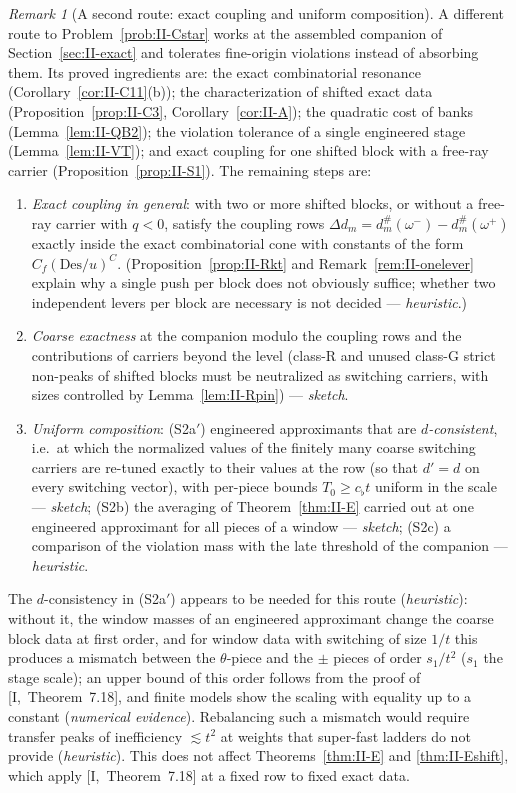 \documentclass[10pt]{amsart}
\theoremstyle{definition}
\theoremstyle{remark}
\newtheorem{remark}[theorem]{Remark}
\begin{document}
\begin{remark}[A second route: exact coupling and uniform composition]\label{rem:II-openS}
A different route to Problem~\ref{prob:II-Cstar} works at the assembled companion of
Section~\ref{sec:II-exact} and tolerates fine-origin violations instead of
absorbing them.  Its proved ingredients are: the exact combinatorial resonance
(Corollary~\ref{cor:II-C11}(b)); the characterization of shifted exact data
(Proposition~\ref{prop:II-C3}, Corollary~\ref{cor:II-A}); the quadratic cost of banks
(Lemma~\ref{lem:II-QB2}); the violation tolerance of a single engineered stage
(Lemma~\ref{lem:II-VT}); and exact coupling for one shifted block with a free-ray
carrier (Proposition~\ref{prop:II-S1}).  The remaining steps are:
\begin{enumerate}
\item[(S1)] \emph{Exact coupling in general}: with two or more shifted blocks, or
without a free-ray carrier with $q<0$, satisfy the coupling rows $\Delta d_m=d^\#_m(\omega^-)-
d^\#_m(\omega^+)$ exactly inside the exact combinatorial cone with constants of the form
$C_f(\mathrm{Des}/u)^C$.  (Proposition~\ref{prop:II-Rkt} and
Remark~\ref{rem:II-onelever} explain why a single push per block does not
obviously suffice; whether two independent levers per block are necessary is
not decided --- \emph{heuristic}.)
\item[(RT$^*$c)] \emph{Coarse exactness} at the companion modulo the coupling rows and
the contributions of carriers beyond the level (class-R and unused class-G strict
non-peaks of shifted blocks must be neutralized as switching carriers, with sizes
controlled by Lemma~\ref{lem:II-Rpin}) --- \emph{sketch}.
\item[(S2)] \emph{Uniform composition}: (S2a$'$) engineered approximants that are
\emph{$d$-consistent}, i.e.\ at which the normalized values of the finitely many coarse
switching carriers are re-tuned exactly to their values at the row (so that $d'=d$ on
every switching vector), with per-piece bounds $T_0\ge c_\flat t$ uniform in the scale
--- \emph{sketch}; (S2b) the averaging of Theorem~\ref{thm:II-E} carried out at one
engineered approximant for all pieces of a window --- \emph{sketch}; (S2c) a
comparison of the violation mass with the late threshold of the companion ---
\emph{heuristic}.
\end{enumerate}
The $d$-consistency in (S2a$'$) appears to be needed for this route
(\emph{heuristic}): without it, the window
masses of an engineered approximant change the coarse block data at first order, and
for window data with switching of size $1/t$ this produces a mismatch between the
$\theta$-piece and the $\pm$ pieces of order $s_1/t^2$ ($s_1$ the stage scale); an upper
bound of this order follows from the proof of [I,~Theorem~7.18], and finite models show
the scaling with equality up to a constant (\emph{numerical evidence}).  Rebalancing such
a mismatch would require transfer peaks of inefficiency $\lesssim t^2$ at weights that
super-fast ladders do not provide (\emph{heuristic}).  This does not affect
Theorems~\ref{thm:II-E} and \ref{thm:II-Eshift}, which apply [I,~Theorem~7.18] at a fixed
row to fixed exact data.
\end{remark}
\end{document}
